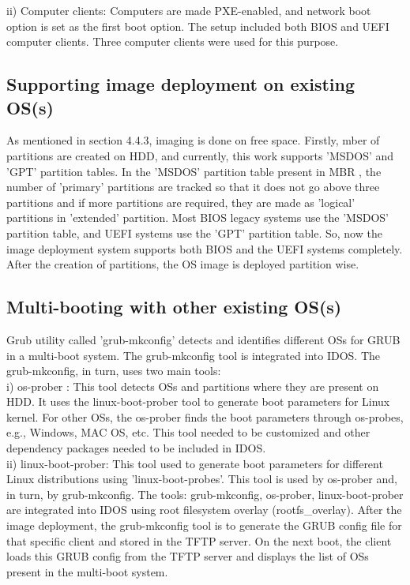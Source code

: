 \documentclass[a4paper,12pt]{article}
\begin{document}
ii) Computer clients: Computers are made PXE-enabled, and network boot option is set as the first boot option. The setup included both BIOS and UEFI computer clients. Three computer clients were used for this purpose.

\subsection{ Supporting image deployment on existing OS(s)}
As mentioned in section 4.4.3, imaging is done on free space. Firstly, 
mber of partitions are created on HDD, and currently, this work supports 'MSDOS' and 'GPT' \cite{GPT} partition tables. In the 'MSDOS' partition table present in MBR \cite{MBR}, the number of 'primary' partitions are tracked so that it does not go above three partitions and if more partitions are required, they are made as 'logical' partitions in 'extended' partition. Most BIOS legacy systems use the 'MSDOS' partition table, and UEFI systems use the 'GPT' partition table. So, now the image deployment system supports both BIOS \cite{BIOS} and the UEFI \cite{UEFI} systems completely. After the creation of partitions, the OS image is deployed partition wise.
\subsection{ Multi-booting with other existing OS(s)}
Grub utility called 'grub-mkconfig' detects and identifies different OSs for GRUB in a multi-boot system. The grub-mkconfig tool is integrated into IDOS. The grub-mkconfig, in turn, uses two main tools: \\
i) os-prober \cite{osprober} : This tool detects OSs and partitions where they are present on HDD. It uses the linux-boot-prober tool to generate boot parameters for  Linux kernel. For other OSs, the os-prober finds the boot parameters through os-probes, e.g., Windows, MAC OS, etc. This tool needed to be customized and other dependency packages needed to be included in IDOS.\\
ii) linux-boot-prober: This tool used to generate boot parameters for different Linux distributions using 'linux-boot-probes'. This tool is used by os-prober and, in turn, by grub-mkconfig.
The tools: grub-mkconfig, os-prober, linux-boot-prober are integrated into IDOS using root filesystem overlay (rootfs\_overlay).
After the image deployment, the grub-mkconfig tool is to generate the GRUB config file for that specific client and stored in the TFTP server. On the next boot, the client loads this GRUB config from the TFTP server and displays the list of OSs present in the multi-boot system.
\end{document}
